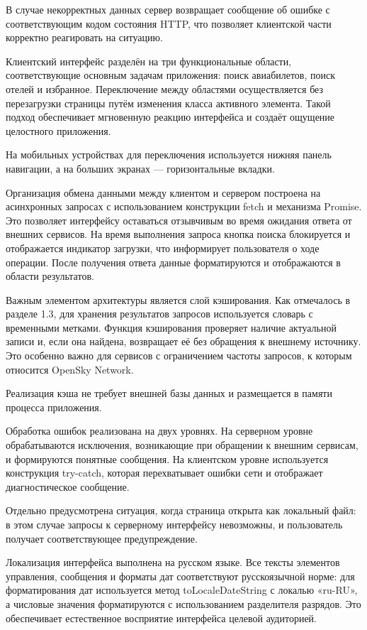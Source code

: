 \documentclass[14pt,a4paper,oneside]{extreport}
\begin{document}
В случае некорректных данных сервер возвращает сообщение об ошибке с соответствующим кодом состояния HTTP, что позволяет клиентской части корректно реагировать на ситуацию.

Клиентский интерфейс разделён на три функциональные области, соответствующие основным задачам приложения: поиск авиабилетов, поиск отелей и избранное. Переключение между областями осуществляется без перезагрузки страницы путём изменения класса активного элемента. Такой подход обеспечивает мгновенную реакцию интерфейса и создаёт ощущение целостного приложения.

На мобильных устройствах для переключения используется нижняя панель навигации, а на больших экранах — горизонтальные вкладки.

Организация обмена данными между клиентом и сервером построена на асинхронных запросах с использованием конструкции fetch и механизма Promise. Это позволяет интерфейсу оставаться отзывчивым во время ожидания ответа от внешних сервисов. На время выполнения запроса кнопка поиска блокируется и отображается индикатор загрузки, что информирует пользователя о ходе операции. После получения ответа данные форматируются и отображаются в области результатов.

Важным элементом архитектуры является слой кэширования. Как отмечалось в разделе 1.3, для хранения результатов запросов используется словарь с временными метками. Функция кэширования проверяет наличие актуальной записи и, если она найдена, возвращает её без обращения к внешнему источнику. Это особенно важно для сервисов с ограничением частоты запросов, к которым относится OpenSky Network.

Реализация кэша не требует внешней базы данных и размещается в памяти процесса приложения.

Обработка ошибок реализована на двух уровнях. На серверном уровне обрабатываются исключения, возникающие при обращении к внешним сервисам, и формируются понятные сообщения. На клиентском уровне используется конструкция try-catch, которая перехватывает ошибки сети и отображает диагностическое сообщение.

Отдельно предусмотрена ситуация, когда страница открыта как локальный файл: в этом случае запросы к серверному интерфейсу невозможны, и пользователь получает соответствующее предупреждение.

Локализация интерфейса выполнена на русском языке. Все тексты элементов управления, сообщения и форматы дат соответствуют русскоязычной норме: для форматирования дат используется метод toLocaleDateString с локалью «ru-RU», а числовые значения форматируются с использованием разделителя разрядов. Это обеспечивает естественное восприятие интерфейса целевой аудиторией.
\end{document}
